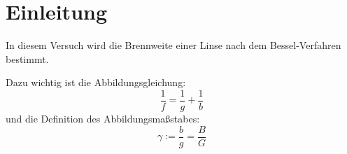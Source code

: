 \section{Einleitung}
In diesem Versuch wird die Brennweite einer Linse nach dem Bessel-Verfahren bestimmt.

Dazu wichtig ist die Abbildungsgleichung:
$$
\frac{1}{f} = \frac{1}{g} + \frac{1}{b}
$$
und die Definition des Abbildungsmaßstabes:
$$
\gamma := \frac{b}{g} = \frac{B}{G}
$$